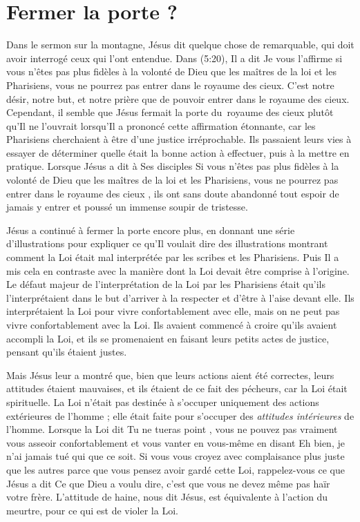 \section{Fermer la porte ?}

Dans le sermon sur la montagne, Jésus dit quelque chose de remarquable,
 qui doit avoir interrogé ceux qui l'ont entendue.
 Dans (5:20), Il a dit\frcolon{}
 \Og Je vous l'affirme\frcolon{}
 si vous n'êtes pas plus fidèles à la volonté de Dieu
 que les maîtres de la loi et les Pharisiens,
 vous ne pourrez pas entrer dans le royaume des cieux. \Fg{}
 C'est notre désir, notre but, et notre prière que de pouvoir entrer
 dans le royaume des cieux.
 Cependant, il semble que Jésus fermait la porte du~royaume des cieux
 plutôt qu'Il ne l'ouvrait lorsqu'Il a prononcé cette affirmation étonnante,
 car les Pharisiens cherchaient à être d'une justice irréprochable.
 Ils passaient leurs vies à essayer de déterminer quelle était
 la bonne action à effectuer,
 puis à la mettre en pratique.
 Lorsque Jésus a dit à Ses disciples\frcolon{}
 \Og Si vous n'êtes pas plus fidèles à la volonté de Dieu que
 les maîtres de la loi et les Pharisiens, vous ne pourrez pas
 entrer dans le royaume des cieux \Fg{},
 ils ont sans doute abandonné tout espoir de jamais y entrer
 et poussé un immense soupir de tristesse.

Jésus a continué à fermer la porte encore plus,
 en donnant une série d'illustrations pour expliquer
 ce qu'Il voulait dire \ocadr des illustrations montrant comment la Loi
 était mal interprétée par les scribes et les Pharisiens.
 Puis Il a mis cela en contraste avec la manière dont la Loi
 devait être comprise à l'origine.
 Le défaut majeur de l'interpré\-ta\-tion de la Loi par les Pharisiens
 était qu'ils l'interprétaient dans le but d'arriver à la respecter
 et d'être à l'aise devant elle.
 Ils interprétaient la Loi pour vivre confortablement avec elle,
 mais on ne peut pas vivre confortablement avec la Loi.
 Ils avaient commencé à croire qu'ils avaient accompli la Loi,
 et ils se promenaient en faisant leurs petits actes de justice,
 pensant qu'ils étaient justes.

Mais Jésus leur a montré que, bien que leurs actions
 aient été correctes, leurs attitudes étaient mauvaises,
 et ils étaient de ce fait des pécheurs,
 car la Loi était spirituelle.
 La Loi n'était pas destinée à s'occuper uniquement des actions extérieures
 de l'homme ; elle était faite pour s'occuper
 des \emph{attitudes intérieures} de l'homme.
 Lorsque la Loi dit\frcolon{} \Og Tu ne tueras point \Fg{},
 vous ne pouvez pas vraiment vous asseoir confortablement et vous vanter
 en vous-même en disant\frcolon{}
 \Og Eh bien, je n'ai jamais tué qui que ce soit. \Fg{}
 Si vous vous croyez avec complaisance plus juste que les autres parce que vous pensez
 avoir gardé cette Loi, rappelez-vous ce que Jésus a dit\frcolon{}
 \Og Ce que Dieu a voulu dire, c'est que vous ne devez même pas
 haïr votre frère. \Fg{}
 L'attitude de haine, nous dit Jésus,
 est équivalente à l'action du meurtre,
 pour ce qui est de violer la Loi.

